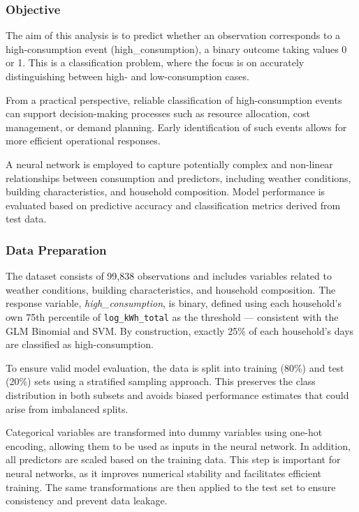 \documentclass[
]{article}
\begin{document}
\subsubsection{Objective}\label{objective-4}

The aim of this analysis is to predict whether an observation
corresponds to a high-consumption event (high\_consumption), a binary
outcome taking values 0 or 1. This is a classification problem, where
the focus is on accurately distinguishing between high- and
low-consumption cases.

From a practical perspective, reliable classification of
high-consumption events can support decision-making processes such as
resource allocation, cost management, or demand planning. Early
identification of such events allows for more efficient operational
responses.

A neural network is employed to capture potentially complex and
non-linear relationships between consumption and predictors, including
weather conditions, building characteristics, and household composition.
Model performance is evaluated based on predictive accuracy and
classification metrics derived from test data.

\subsubsection{Data Preparation}\label{data-preparation}

The dataset consists of 99,838 observations and includes variables
related to weather conditions, building characteristics, and household
composition. The response variable, \emph{high\_consumption}, is binary,
defined using each household's own 75th percentile of
\texttt{log\_kWh\_total} as the threshold --- consistent with the GLM
Binomial and SVM. By construction, exactly 25\% of each household's days
are classified as high-consumption.

To ensure valid model evaluation, the data is split into training (80\%)
and test (20\%) sets using a stratified sampling approach. This
preserves the class distribution in both subsets and avoids biased
performance estimates that could arise from imbalanced splits.

Categorical variables are transformed into dummy variables using one-hot
encoding, allowing them to be used as inputs in the neural network. In
addition, all predictors are scaled based on the training data. This
step is important for neural networks, as it improves numerical
stability and facilitates efficient training. The same transformations
are then applied to the test set to ensure consistency and prevent data
leakage.
\end{document}
